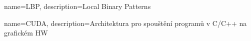 {
    name=LBP,
    description={Local Binary Patterns}
}

{
    name=CUDA,
    description={Architektura pro spouštění programů v C/C++ na grafickém HW}
}